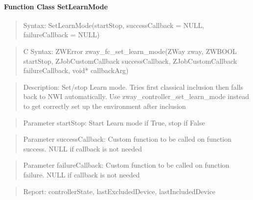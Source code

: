 \paragraph{Function Class SetLearnMode}
\begin{quote}Syntax: SetLearnMode(startStop, successCallback = NULL, failureCallback = NULL)\end{quote}
\begin{quote}C Syntax: ZWError zway\_fc\_set\_learn\_mode(ZWay zway, ZWBOOL startStop, ZJobCustomCallback successCallback, ZJobCustomCallback failureCallback, void* callbackArg)\end{quote}
\begin{quote}Description: Set/stop Learn mode. Tries first classical inclusion then falls back to NWI automatically. Use zway\_controller\_set\_learn\_mode instead to get correctly set up the environment after inclusion\end{quote}
\begin{quote}Parameter startStop: Start Learn mode if True, stop if False\end{quote}
\begin{quote}Parameter successCallback: Custom function to be called on function success. NULL if callback is not needed\end{quote}
\begin{quote}Parameter failureCallback: Custom function to be called on function failure. NULL if callback is not needed\end{quote}
\begin{quote}Report: controllerState, lastExcludedDevice, lastIncludedDevice\end{quote}

